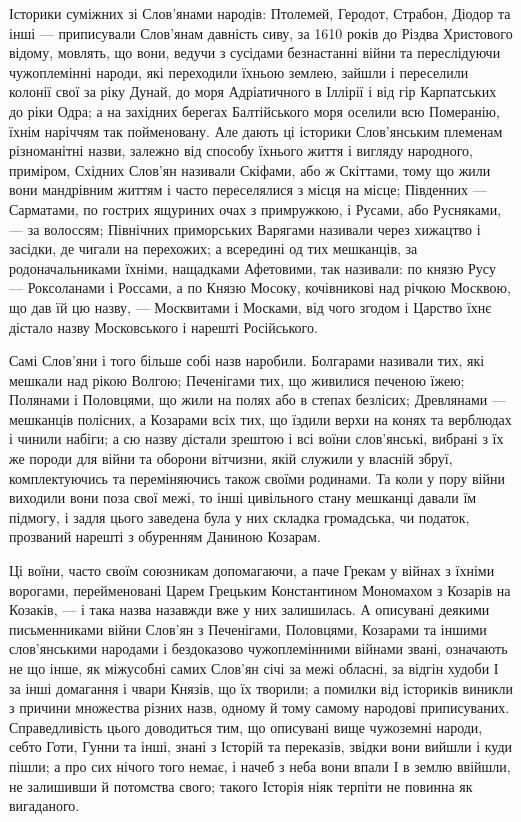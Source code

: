 Історики суміжних зі Слов'янами народів: Птолемей, Геродот, Страбон, Діодор та
інші — приписували Слов'янам давність сиву, за 1610 років до Різдва Христового
відому, мовлять, що вони, ведучи з сусідами безнастанні війни та переслідуючи
чужоплемінні народи, які переходили їхньою землею, зайшли і переселили колонії
свої за ріку Дунай, до моря Адріатичного в Іллірії і від гір Карпатських до
ріки Одра; а на західних берегах Балтійського моря оселили всю Померанію, їхнім
наріччям так пойменовану. Але дають ці історики Слов'янським племенам
різноманітні назви, залежно від способу їхнього життя і вигляду народного,
приміром, Східних Слов'ян називали Скіфами, або ж Скіттами, тому що жили вони
мандрівним життям і часто переселялися з місця на місце; Південних — Сарматами,
по гострих ящуриних очах з примружкою, і Русами, або Русняками, — за волоссям;
Північних приморських Варягами називали через хижацтво і засідки, де чигали на
перехожих; а всередині од тих мешканців, за родоначальниками їхніми, нащадками
Афетовими, так називали: по князю Русу — Роксоланами і Россами, а по Князю
Мосоку, кочівникові над річкою Москвою, що дав їй цю назву, — Москвитами і
Москами, від чого згодом і Царство їхнє дістало назву Московського і нарешті
Російського.

Самі Слов'яни і того більше собі назв наробили. Болгарами називали тих, які
мешкали над рікою Волгою; Печенігами тих, що живилися печеною їжею; Полянами і
Половцями, що жили на полях або в степах безлісих; Древлянами — мешканців
полісних, а Козарами всіх тих, що їздили верхи на конях та верблюдах і чинили
набіги; а сю назву дістали зрештою і всі воїни слов'янські, вибрані з їх же
породи для війни та оборони вітчизни, якій служили у власній збруї,
комплектуючись та переміняючись також своїми родинами. Та коли у пору війни
виходили вони поза свої межі, то інші цивільного стану мешканці давали їм
підмогу, і задля цього заведена була у них складка громадська, чи податок,
прозваний нарешті з обуренням Даниною Козарам.

Ці воїни, часто своїм союзникам допомагаючи, а паче Грекам у війнах з їхніми
ворогами, перейменовані Царем Грецьким Константином Мономахом з Козарів на
Козаків, — і така назва назавжди вже у них залишилась. А описувані деякими
письменниками війни Слов'ян з Печенігами, Половцями, Козарами та іншими
слов'янськими народами і бездоказово чужоплемінними війнами звані, означають не
що інше, як міжусобні самих Слов'ян січі за межі обласні, за відгін худоби І за
інші домагання і чвари Князів, що їх творили; а помилки від істориків виникли з
причини множества різних назв, одному й тому самому народові приписуваних.
Справедливість цього доводиться тим, що описувані вище чужоземні народи, себто
Готи, Гунни та інші, знані з Історій та переказів, звідки вони вийшли і куди
пішли; а про сих нічого того немає, і начеб з неба вони впали І в землю
ввійшли, не залишивши й потомства свого; такого Історія ніяк терпіти не повинна
як вигаданого.

